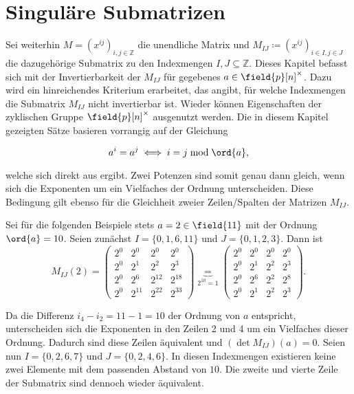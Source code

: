 \section{Singuläre Submatrizen} \label{sec:singulaereSubmatrizen}

Sei weiterhin $M = \left( x^{ij} \right)_{i,j \in \mathbb{Z}}$ die unendliche Matrix und $M_{IJ} \coloneqq \left( x^{ij} \right)_{i \in I,j \in J}$ die dazugehörige Submatrix zu den Indexmengen $I,J \subseteq \mathbb{Z}$. Dieses Kapitel befasst sich mit der Invertierbarkeit der $M_{IJ}$ für gegebenes $a \in \field{p}[n]^\times$. Dazu wird ein hinreichendes Kriterium erarbeitet, das angibt, für welche Indexmengen die Submatrix $M_{IJ}$ nicht invertierbar ist. Wieder können Eigenschaften der zyklischen Gruppe $\field{p}[n]^\times$ ausgenutzt werden. Die in diesem Kapitel gezeigten Sätze basieren vorrangig auf der Gleichung

\begin{equation*}
    a^i = a^j \iff i = j \bmod \ord{a},
\end{equation*}

welche sich direkt aus  ergibt. Zwei Potenzen sind somit genau dann gleich, wenn sich die Exponenten um ein Vielfaches der Ordnung unterscheiden. Diese Bedingung gilt ebenso für die Gleichheit zweier Zeilen/Spalten der Matrizen $M_{IJ}$. 

Sei für die folgenden Beispiele stets $a = 2 \in \field{11}$ mit der Ordnung $\ord{a} = 10$. Seien zunächst $I=\{0,1,6,11\}$ und $J=\{0,1,2,3\}$. Dann ist 
\begin{equation*}
    M_{IJ}(2) = \begin{pmatrix}
        2^{0} & 2^{0} & 2^{0} & 2^{0} \\
        2^{0} & 2^{1} & 2^{2} & 2^{3} \\
        2^{0} & 2^{6} & 2^{12} & 2^{18} \\
        2^{0} & 2^{11} & 2^{22} & 2^{33} 
    \end{pmatrix} \underbrace{=}_{2^{10}=1} \begin{pmatrix}
        2^{0} & 2^{0} & 2^{0} & 2^{0} \\
        2^{0} & 2^{1} & 2^{2} & 2^{3} \\
        2^{0} & 2^{6} & 2^{2} & 2^{8} \\
        2^{0} & 2^{1} & 2^{2} & 2^{3} 
    \end{pmatrix}.
\end{equation*}

Da die Differenz $i_4 - i_2 = 11 - 1 = 10$ der Ordnung von $a$ entspricht, unterscheiden sich die Exponenten in den Zeilen 2 und 4 um ein Vielfaches dieser Ordnung. Dadurch sind diese Zeilen äquivalent und $(\det M_{IJ})(a) = 0$.
Seien nun $I=\{0,2,6,7\}$ und $J=\{0,2,4,6\}$. In diesen Indexmengen existieren keine zwei Elemente mit dem passenden Abstand von $10$. Die zweite und vierte Zeile der Submatrix sind dennoch wieder äquivalent.


